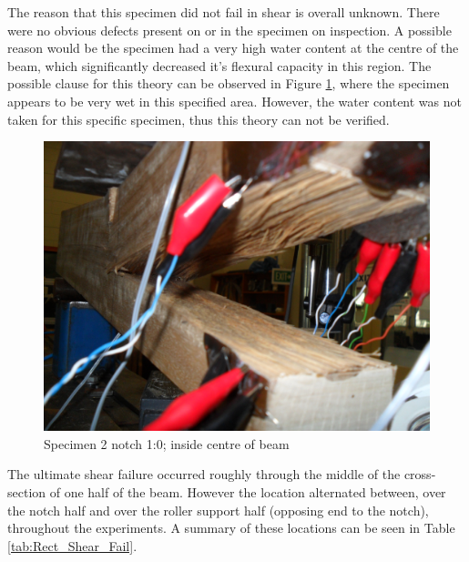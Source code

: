 \documentclass[11pt,a4paper]{article}
\numberwithin{equation}{subsection}
\begin{document}
\noindent
The reason that this specimen did not fail in shear is overall unknown. There were no obvious defects present on or in the specimen on inspection. A possible reason would be the specimen had a very high water content at the centre of the beam, which significantly decreased it's flexural capacity in this region. The possible clause for this theory can be observed in Figure \ref{fig:Spec_2_wet}, where the specimen appears to be very wet in this specified area. However, the water content was not taken for this specific specimen, thus this theory can not be verified. 

\begin{figure}[h]
	\begin{center}
		\includegraphics[scale=0.1]{Spec_2_wet}
	\end{center}
	\caption{Specimen 2 notch 1:0; inside centre of beam}
	\label{fig:Spec_2_wet}
\end{figure}

\noindent
The ultimate shear failure occurred roughly through the middle of the cross-section of one half of the beam. However the location alternated between, over the notch half and over the roller support half (opposing end to the notch), throughout the experiments. A summary of these locations can be seen in Table \ref{tab:Rect_Shear_Fail}.

\vspace*{\baselineskip}
\end{document}
